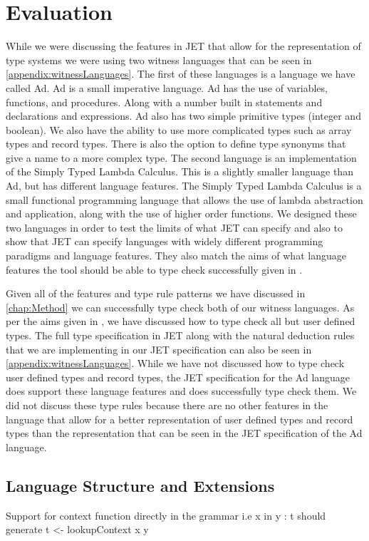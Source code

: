 \chapter{Evaluation}

While we were discussing the features in JET that allow for the representation of type systems we were using two witness languages that can be seen in \autoref{appendix:witnessLanguages}.
The first of these languages is a language we have called Ad.
Ad is a small imperative language.
Ad has the use of variables, functions, and procedures.
Along with a number built in statements and declarations and expressions.
Ad also has two simple primitive types (integer and boolean).
We also have the ability to use more complicated types such as array types and record types.
There is also the option to define type synonyms that give a name to a more complex type.
The second language is an implementation of the Simply Typed Lambda Calculus.
This is a slightly smaller language than Ad, but has different language features.
The Simply Typed Lambda Calculus is a small functional programming language that allows the use of lambda abstraction and application, along with the use of higher order functions.
We designed these two languages in order to test the limits of what JET can specify and also to show that JET can specify languages with widely different programming paradigms and language features.
They also match the aims of what language features the tool should be able to type check successfully given in .

Given all of the features and type rule patterns we have discussed in \autoref{chap:Method} we can successfully type check both of our witness languages.
As per the aims given in , we have discussed how to type check all but user defined types.
The full type specification in JET along with the natural deduction rules that we are implementing in our JET specification can also be seen in \autoref{appendix:witnessLanguages}.
While we have not discussed how to type check user defined types and record types, the JET specification for the Ad language does support these language features and does successfully type check them.
We did not discuss these type rules because there are no other features in the language that allow for a better representation of user defined types and record types than the representation that can be seen in the JET specification of the Ad language.

\section{Language Structure and Extensions}
Support for context function directly in the grammar i.e x in y : t should generate t <- lookupContext x y

